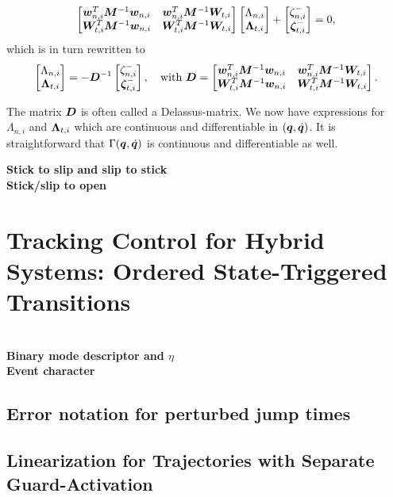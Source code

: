 \documentclass[../DC2017114Bouma.tex]{subfiles}
\begin{document}
\begin{align}
\begin{bmatrix}
{\boldsymbol{w}}_{n,i}^T{\boldsymbol{M}}^{-1}{\boldsymbol{w}}_{n,i} & {\boldsymbol{w}}_{n,i}^T{\boldsymbol{M}}^{-1}{\boldsymbol{W}}_{t,i} \\
{\boldsymbol{W}}_{t,i}^T{\boldsymbol{M}}^{-1}{\boldsymbol{w}}_{n,i} & {\boldsymbol{W}}_{t,i}^T{\boldsymbol{M}}^{-1}{\boldsymbol{W}}_{t,i}
\end{bmatrix}
\begin{bmatrix}
\Lambda_{n,i}\\
\boldsymbol{\Lambda}_{t,i}
\end{bmatrix} + \begin{bmatrix}
\zeta_{n,i}^-\\
\boldsymbol{\zeta}_{t,i}^-
\end{bmatrix}
= 0,
\end{align}
which is in turn rewritten to
\begin{align}
\begin{bmatrix}
\Lambda_{n,i}\\
\boldsymbol{\Lambda}_{t,i}
\end{bmatrix} = - {\boldsymbol{D}}^{-1}\begin{bmatrix}
\zeta_{n,i}^-\\
\boldsymbol{\zeta}_{t,i}^-
\end{bmatrix},\quad \text{with } {\boldsymbol{D}} = \begin{bmatrix}
{\boldsymbol{w}}_{n,i}^T{\boldsymbol{M}}^{-1}{\boldsymbol{w}}_{n,i} & {\boldsymbol{w}}_{n,i}^T{\boldsymbol{M}}^{-1}{\boldsymbol{W}}_{t,i} \\
{\boldsymbol{W}}_{t,i}^T{\boldsymbol{M}}^{-1}{\boldsymbol{w}}_{n,i} & {\boldsymbol{W}}_{t,i}^T{\boldsymbol{M}}^{-1}{\boldsymbol{W}}_{t,i}
\end{bmatrix}.
\end{align}

The matrix ${\boldsymbol{D}}$ is often called a Delassus-matrix. We now have expressions for $\Lambda_{n,i}$ and $\boldsymbol{\Lambda}_{t,i}$ which are continuous and differentiable in $({\boldsymbol{q}},\dot{{\boldsymbol{q}}})$. It is straightforward that $\Gamma({\boldsymbol{q}},\dot{{\boldsymbol{q}}})$ is continuous and differentiable as well.

\textbf{Stick to slip and slip to stick}\\

\textbf{Stick/slip to open}\\

\cleartooddpage
\chapter{Tracking Control for Hybrid Systems: Ordered State-Triggered Transitions}
\cite{Rijnen2017}\\
\textbf{Binary mode descriptor and $\eta$}\\
\textbf{Event character}\\

\section{Error notation for perturbed jump times}
\section{Linearization for Trajectories with Separate Guard-Activation}
\end{document}
